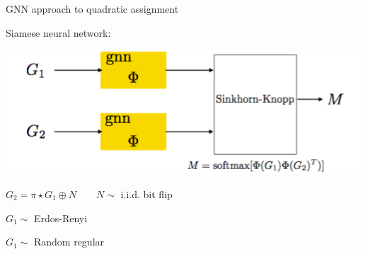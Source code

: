 \documentclass{beamer}
\begin{document}
\begin{frame}{GNN approach to quadratic assignment}


Siamese neural network:

\begin{center}
\includegraphics[height=.2\textwidth]{figs/gnn_qap}
\end{center}

$G_2 = \pi \star G_1 \oplus N \quad\quad N\sim $ i.i.d. bit flip 

$G_1\sim$ Erdos-Renyi

$G_1\sim$ Random regular

\let\thefootnote\relax{}
\end{frame}
\end{document}
